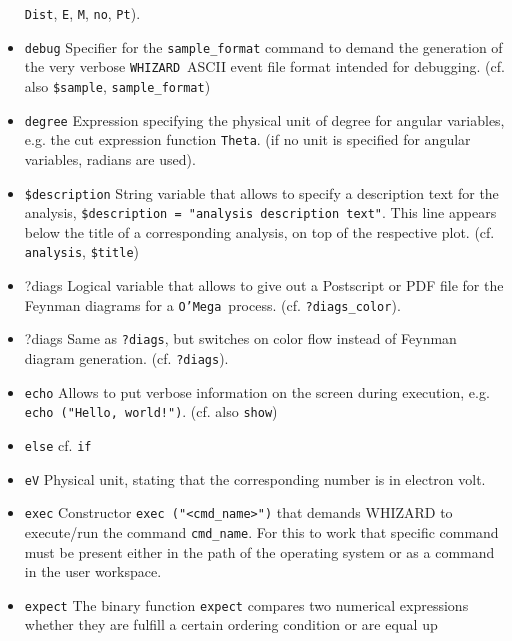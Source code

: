 \documentclass[12pt]{book}
\newcommand{\ttt}[1]{\texttt{#1}}
\newcommand{\whizard}{\texttt{WHIZARD}}
\newcommand{\oMega}{\texttt{O'Mega}}
\begin{document}
\begin{itemize}
\ttt{Dist}, \ttt{E}, \ttt{M}, 
\ttt{no}, \ttt{Pt}).
\item
\ttt{debug} \newline 
Specifier for the \ttt{sample\_format} command to demand the
generation of the very verbose \whizard\ ASCII event
file format intended for debugging. (cf. also \ttt{\$sample}, 
\ttt{sample\_format}) 
\item
\ttt{degree} \newline
Expression specifying the physical unit of degree for angular
variables, e.g. the cut expression function \ttt{Theta}. (if no unit is
specified for angular variables, radians are used). 
\item
\ttt{\$description} \newline
String variable that allows to specify a description text for the
analysis, \ttt{\$description = "analysis description text"}.  
This line appears below the title of a corresponding analysis, on top
of the respective plot. (cf. \ttt{analysis}, \ttt{\$title})
\item{?diags} \newline
Logical variable that allows to give out a Postscript or PDF file 
for the Feynman diagrams for a \oMega\ process. (cf. \ttt{?diags\_color}). 
\item{?diags} \newline
Same as \ttt{?diags}, but switches on color flow instead of Feynman
diagram generation. (cf. \ttt{?diags}). 
\item
\ttt{echo} \newline 
Allows to put verbose information on the screen during execution, e.g.
\ttt{echo ("Hello, world!")}.
(cf. also \ttt{show})
\item
\ttt{else} \newline 
cf. \ttt{if}
\item
\ttt{eV} \newline
Physical unit, stating that the corresponding number is in electron volt.
\item
\ttt{exec} \newline
Constructor \ttt{exec ("<cmd\_name>")} that demands WHIZARD to
execute/run the command \ttt{cmd\_name}. For this to work that
specific command must be present either in the path of the operating
system or as a command in the user workspace. 
\item
\ttt{expect} \newline
The binary function \ttt{expect} compares two numerical expressions
whether they are fulfill a certain ordering condition or are equal up

\end{itemize}
\end{document}
